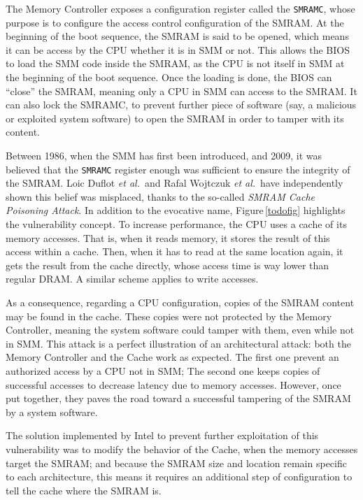 The Memory Controller exposes a configuration register called the
\texttt{SMRAMC}, whose purpose is to configure the access control configuration
of the SMRAM.
%
At the beginning of the boot sequence, the SMRAM is said to be opened, which
means it can be access by the CPU whether it is in SMM or not.
%
This allows the BIOS to load the SMM code inside the SMRAM, as the CPU is not
itself in SMM at the beginning of the boot sequence.
%
Once the loading is done, the BIOS can ``close'' the SMRAM, meaning only a CPU
in SMM can access to the SMRAM.
%
It can also lock the SMRAMC, to prevent further piece of software (say, a
malicious or exploited system software) to open the SMRAM in order to tamper
with its content.

Between 1986, when the SMM has first been introduced,
and 2009, it was believed that the \texttt{SMRAMC} register enough was
sufficient to ensure the integrity of the SMRAM.
%
Loic Duflot \emph{et al.}\,\cite{duflot2009smram} and Rafal Wojtczuk \emph{et
  al.}\,\cite{wojtczuk2009smram} have independently shown this belief was
misplaced, thanks to the so-called \emph{SMRAM Cache Poisoning Attack}.
%
In addition to the evocative name, Figure\,\ref{todofig} highlights the
vulnerability concept.
%
To increase performance, the CPU uses a cache of its memory accesses.
%
That is, when it reads memory, it stores the result of this access within a
cache.
%
Then, when it has to read at the same location again, it gets the result from
the cache directly, whose access time is way lower than regular DRAM.
%
A similar scheme applies to write accesses.

As a consequence, regarding a CPU configuration, copies of the SMRAM content may
be found in the cache.
%
These copies were not protected by the Memory Controller, meaning the system
software could tamper with them, even while not in SMM.
%
This attack is a perfect illustration of an architectural attack:
%
both the Memory Controller and the Cache work as expected.
%
The first one prevent an authorized access by a CPU not in SMM;
%
The second one keeps copies of successful accesses to decrease latency due to
memory accesses.
%
However, once put together, they paves the road toward a successful tampering of
the SMRAM by a system software.

The solution implemented by Intel to prevent further exploitation of this
vulnerability was to modify the behavior of the Cache, when the memory accesses
target the SMRAM;
%
and because the SMRAM size and location remain specific to each architecture,
this means it requires an additional step of configuration to tell the cache
where the SMRAM is.

